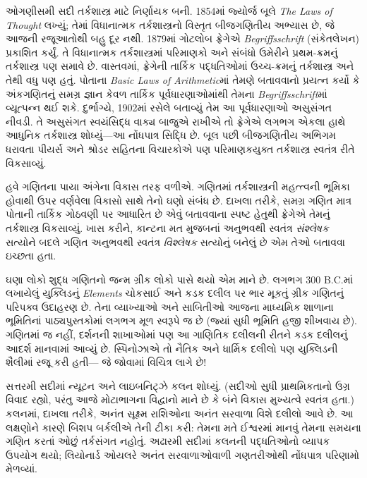 ઓગણીસમી સદી તર્કશાસ્ત્ર માટે નિર્ણાયક બની. 1854માં
જ્યોર્જ બૂલે \emph{The Laws of Thought} લખ્યું;
તેમાં વિધાનાત્મક તર્કશાસ્ત્રનો વિસ્તૃત બીજગણિતીય અભ્યાસ
છે, જે આજની રજૂઆતોથી બહુ દૂર નથી. 1879માં ગોટલોબ
ફ્રેગેએ \emph{Begriffsschrift} (સંકેતલેખન) પ્રકાશિત
કર્યું. તે વિધાનાત્મક તર્કશાસ્ત્રમાં પરિમાણકો અને સંબંધો
ઉમેરીને પ્રથમ-ક્રમનું તર્કશાસ્ત્ર પણ સમાવે છે. વાસ્તવમાં,
ફ્રેગેની તાર્કિક પદ્ધતિઓમાં ઉચ્ચ-ક્રમનું તર્કશાસ્ત્ર અને
તેથી વધુ પણ હતું. પોતાના \emph{Basic Laws of
  Arithmetic}માં તેમણે બતાવવાનો પ્રયત્ન કર્યો કે
અંકગણિતનું સમગ્ર જ્ઞાન કેવળ તાર્કિક પૂર્વધારણાઓમાંથી
તેમના \emph{Begriffsschrift}માં વ્યૂત્પન્ન થઈ શકે.
દુર્ભાગ્યે, 1902માં રસેલે બતાવ્યું તેમ આ પૂર્વધારણાઓ
અસુસંગત નીવડી. તે અસુસંગત સ્વયંસિદ્ધ વાક્ય બાજુએ
રાખીએ તો ફ્રેગેએ લગભગ એકલા હાથે આધુનિક તર્કશાસ્ત્ર
શોધ્યું—આ નોંધપાત્ર સિદ્ધિ છે. બૂલ પછી બીજગણિતીય
અભિગમ ધરાવતા પીયર્સ અને શ્રોડર સહિતના વિચારકોએ પણ
પરિમાણકયુક્ત તર્કશાસ્ત્ર સ્વતંત્ર રીતે વિકસાવ્યું.

હવે ગણિતના પાયા અંગેના વિકાસ તરફ વળીએ. ગણિતમાં
તર્કશાસ્ત્રની મહત્ત્વની ભૂમિકા હોવાથી ઉપર વર્ણવેલા
વિકાસો સાથે તેનો ઘણો સંબંધ છે. દાખલા તરીકે, સમગ્ર
ગણિત માત્ર પોતાની તાર્કિક ગોઠવણી પર આધારિત છે એવું
બતાવવાના સ્પષ્ટ હેતુથી ફ્રેગેએ તેમનું તર્કશાસ્ત્ર
વિકસાવ્યું. ખાસ કરીને, કાન્ટના મત મુજબનાં અનુભવથી
સ્વતંત્ર \emph{સંશ્લેષક} સત્યોને બદલે ગણિત અનુભવથી
સ્વતંત્ર \emph{વિશ્લેષક} સત્યોનું બનેલું છે એમ તેઓ બતાવવા ઇચ્છતા હતા.

ઘણા લોકો શુદ્ધ ગણિતનો જન્મ ગ્રીક લોકો પાસે થયો એમ
માને છે. લગભગ 300 B.C.માં લખાયેલું યુક્લિડનું
\emph{Elements} ચોકસાઈ અને કડક દલીલ પર ભાર મૂકતું
ગ્રીક ગણિતનું પરિપક્વ ઉદાહરણ છે. તેના વ્યાખ્યાઓ અને
સાબિતીઓ આજના માધ્યમિક શાળાના ભૂમિતિનાં પાઠ્યપુસ્તકોમાં
લગભગ મૂળ સ્વરૂપે જ છે (જ્યાં સુધી ભૂમિતિ હજી શીખવાય છે).
ગણિતમાં જ નહીં, દર્શનની શાખાઓમાં પણ આ ગાણિતિક દલીલની
રીતને કડક દલીલનું આદર્શ માનવામાં આવ્યું છે. સ્પિનોઝાએ તો
નૈતિક અને ધાર્મિક દલીલો પણ યુક્લિડની શૈલીમાં રજૂ કરી હતી—
જે જોવામાં વિચિત્ર લાગે છે!

સત્તરમી સદીમાં ન્યૂટન અને લાઇબનિટ્ઝે કલન શોધ્યું.
(સદીઓ સુધી પ્રાથમિકતાનો ઉગ્ર વિવાદ રહ્યો, પરંતુ આજે
મોટાભાગના વિદ્વાનો માને છે કે બંને વિકાસ મુખ્યત્વે
સ્વતંત્ર હતા.) કલનમાં, દાખલા તરીકે, અનંત સૂક્ષ્મ
રાશિઓના અનંત સરવાળા વિશે દલીલો આવે છે. આ લક્ષણોને
કારણે બિશપ બર્કલીએ તેની ટીકા કરી: તેમના મતે ઈશ્વરમાં
માનવું તેમના સમયના ગણિત કરતાં ઓછું તર્કસંગત નહોતું.
અઢારમી સદીમાં કલનની પદ્ધતિઓનો વ્યાપક ઉપયોગ થયો;
લિયોનાર્ડ ઓયલરે અનંત સરવાળાઓવાળી ગણતરીઓથી નોંધપાત્ર
પરિણામો મેળવ્યાં.

